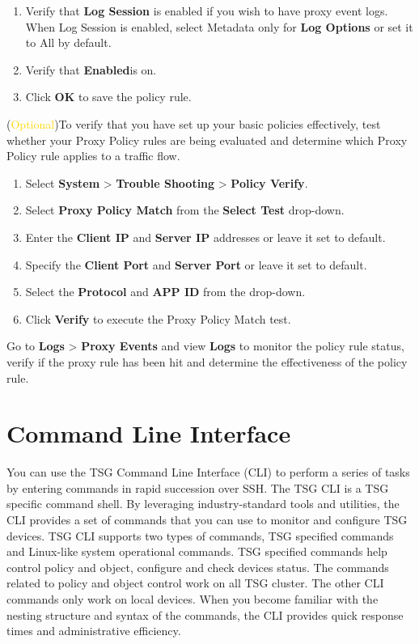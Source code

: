 \begin{description}
\begin{enumerate}
        \item Verify that \textbf{Log Session} is enabled if you wish to have proxy event logs. When Log Session is enabled, select Metadata only for \textbf{Log Options} or set it to All by default. 
        \item Verify that \textbf{Enabled}is on.
        \item Click \textbf{OK} to save the policy rule.
    \end{enumerate}
    \item[STEP 2.] (\textcolor{gold}{Optional})To verify that you have set up your basic policies effectively, test whether your Proxy Policy rules are being evaluated 
    and determine which Proxy Policy rule applies to a traffic flow.
    \begin{enumerate} 
        \item Select \textbf{System} > \textbf{Trouble Shooting} > \textbf{Policy Verify}.
        \item Select \textbf{Proxy Policy Match} from the \textbf{Select Test} drop-down. 
        \item Enter the \textbf{Client IP} and \textbf{Server IP} addresses or leave it set to default.
        \item Specify the \textbf{Client Port} and \textbf{Server Port} or leave it set to default.
        \item Select the \textbf{Protocol} and \textbf{APP ID} from the drop-down. 
        \item Click \textbf{Verify} to execute the Proxy Policy Match test.
    \end{enumerate}
    \item[STEP 3.] Go to \textbf{Logs} > \textbf{Proxy Events} and view \textbf{Logs} to monitor the policy rule status, verify if the proxy rule has been hit and determine the effectiveness of the policy rule.
\end{description}

\section*{\hypertarget{link:Command Line Interface}{Command Line Interface}}
\label{sec:intro:command}

You can use the TSG Command Line Interface (CLI) to perform a series of tasks by entering commands in rapid succession over SSH. 
The TSG CLI is a TSG specific command shell. By leveraging industry-standard tools and utilities, the CLI provides a set of commands that you can use to monitor and configure TSG devices. 
TSG CLI supports two types of commands, TSG specified commands and Linux-like system operational commands. 
TSG specified commands help control policy and object, configure and check devices status. The commands related to policy and object control work on all TSG cluster. 
The other CLI commands only work on local devices. When you become familiar with the nesting structure and syntax of the commands, the CLI provides quick response times and administrative efficiency.



